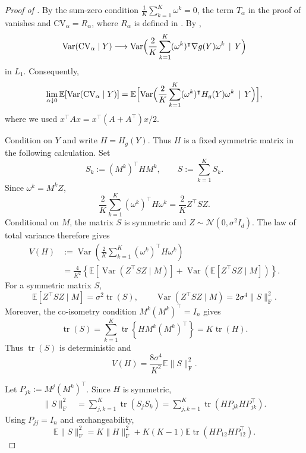 \documentclass[12pt]{article}
\def\calN{\mathcal{N}}
\newcommand{\tran}{^\intercal}
\theoremstyle{general}
\newcommand{\cv}{{\mathrm{CV}}}
\begin{document}
\begin{proof}[Proof of ]
By the sum-zero condition $\frac1K\sum_{k=1}^K\omega^k=0$,
the term $T_\alpha$ in the proof of
 vanishes and $\cv_\alpha=R_\alpha$, where $R_\alpha$ 
is defined in . By
,
\[
\operatorname{Var}(\cv_\alpha\mid Y)
\longrightarrow
\operatorname{Var}\Bigl(
\frac2K\sum_{k=1}^K
(\omega^k)\tran\nabla g(Y)\omega^k
\, \mid \,Y
\Bigr)
\]
in $L_1$. Consequently,
\begin{align}
\lim_{\alpha\downarrow0}
\mathbb E\!\left[
\operatorname{Var}(\cv_\alpha\mid Y)
\right]
=
\mathbb E\Bigl[
\operatorname{Var}\Bigl(
\frac2K\sum_{k=1}^K
(\omega^k)\tran H_g(Y)\omega^k
\,\mid \,Y
\Bigr)
\Bigr],
\label{equ:rvar:limit}
\end{align}
where we used $x^\top A x=x^\top(A+A^\top)x/2$.

Condition on $Y$ and write $H=H_g(Y)$. Thus $H$ is a fixed symmetric
matrix in the following calculation. Set
\[
S_k:=(M^k)\tran H M^k,
\qquad
S:=\sum_{k=1}^KS_k.
\]
Since $\omega^k=M^kZ$,
\[
\frac2K\sum_{k=1}^K(\omega^k)\tran H\omega^k
=
\frac2K Z\tran S Z.
\]
Conditional on $M$, the matrix $S$ is symmetric and
$Z\sim\calN(0,\sigma^2I_d)$. The law of total variance therefore gives
\begin{align*}
V(H)
&:=
\operatorname{Var}\left(
\frac2K\sum_{k=1}^K(\omega^k)\tran H\omega^k
\right)\\
&=
\frac4{K^2}
\left\{
\mathbb E\!\left[
\operatorname{Var}(Z\tran S Z\mid M)
\right]
+
\operatorname{Var}\left(
\mathbb E[Z\tran S Z\mid M]
\right)
\right\}.
\end{align*}
For a symmetric matrix $S$,
\[
\mathbb E[Z\tran S Z\mid M]
=
\sigma^2\operatorname{tr}(S),
\qquad
\operatorname{Var}(Z\tran S Z\mid M)
=
2\sigma^4\|S\|_{\mathrm F}^2.
\]
Moreover, the co-isometry condition
$M^k(M^k)\tran=I_n$ gives
\[
\operatorname{tr}(S)
=
\sum_{k=1}^K
\operatorname{tr}\left\{
H M^k(M^k)\tran
\right\}
=
K\operatorname{tr}(H).
\]
Thus $\operatorname{tr}(S)$ is deterministic and
\begin{equation}
V(H)
=
\frac{8\sigma^4}{K^2}
\mathbb E\|S\|_{\mathrm F}^2.
\label{eq:V-corrected}
\end{equation}

Let $P_{jk}:=M^j(M^k)\tran$.
Since $H$ is symmetric,
\begin{align*}
\|S\|_{\mathrm F}^2
&=
\sum_{j,k=1}^K\operatorname{tr}(S_jS_k)=
\sum_{j,k=1}^K
\operatorname{tr}
\left(
H P_{jk}H P_{jk}\tran
\right).
\end{align*}
Using $P_{jj}=I_n$ and exchangeability,
\begin{equation}
\mathbb E\|S\|_{\mathrm F}^2
=
K\|H\|_{\mathrm F}^2
+
K(K-1)
\mathbb E\operatorname{tr}
\left(
H P_{12}H P_{12}\tran
\right).
\label{eq:S2-corrected}
\end{equation}


\end{proof}
\end{document}
